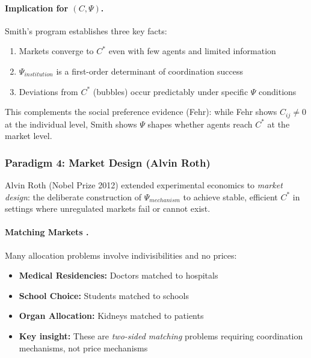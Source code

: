 \paragraph{Implication for $(C, \Psi)$.}
Smith's program establishes three key facts:
\begin{enumerate}[nosep]
    \item Markets converge to $C^*$ even with few agents and limited information
    \item $\Psi_{institution}$ is a first-order determinant of coordination success
    \item Deviations from $C^*$ (bubbles) occur predictably under specific
          $\Psi$ conditions
\end{enumerate}
This complements the social preference evidence (Fehr): while Fehr shows
$C_{ij} \neq 0$ at the individual level, Smith shows $\Psi$ shapes whether
agents reach $C^*$ at the market level.


\subsubsection{Paradigm 4: Market Design (Alvin Roth)}

Alvin Roth (Nobel Prize 2012) extended experimental economics to \emph{market design}:
the deliberate construction of $\Psi_{mechanism}$ to achieve stable, efficient $C^*$
in settings where unregulated markets fail or cannot exist.

\paragraph{Matching Markets \citep{roth1984evolution}.}
Many allocation problems involve indivisibilities and no prices:
\begin{itemize}[nosep]
    \item \textbf{Medical Residencies:} Doctors matched to hospitals
    \item \textbf{School Choice:} Students matched to schools
    \item \textbf{Organ Allocation:} Kidneys matched to patients
    \item \textbf{Key insight:} These are \emph{two-sided matching} problems
          requiring coordination mechanisms, not price mechanisms
\end{itemize}

